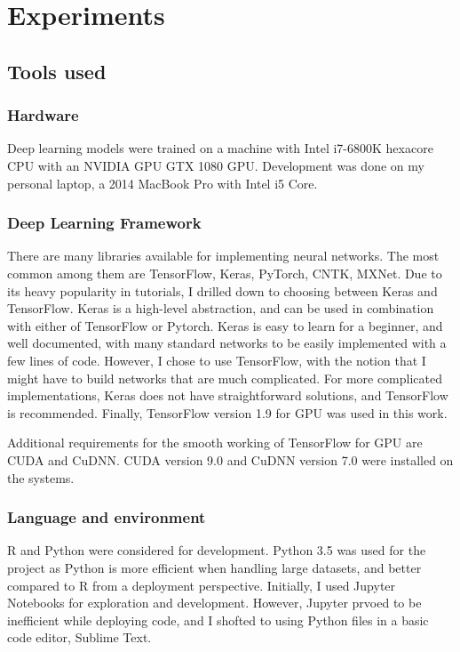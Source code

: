 \chapter{Experiments}

\section{Tools used}

\subsection{Hardware}
Deep learning models were trained on a machine with Intel i7-6800K hexacore CPU with an NVIDIA GPU GTX 1080 GPU. Development was done on my personal laptop, a 2014 MacBook Pro with Intel i5 Core.

\subsection{Deep Learning Framework}
There are many libraries available for implementing neural networks. The most common among them are TensorFlow\cite{noauthor_TensorFlow:_2018}, Keras\cite{noauthor_keras_nodate}, PyTorch\cite{noauthor_pytorch_nodate}, CNTK\cite{noauthor_microsoft_2018}, MXNet\cite{noauthor_incubator-mxnet:_2018}. Due to its heavy popularity in tutorials, I drilled down to choosing between Keras and TensorFlow. Keras is a high-level abstraction, and can be used in combination with either of TensorFlow or Pytorch. Keras is easy to learn for a beginner, and well documented, with many standard networks to be easily implemented with a few lines of code. However, I chose to use TensorFlow, with the notion that I might have to build networks that are much complicated. For more complicated implementations, Keras does not have straightforward solutions, and TensorFlow is recommended. 
Finally, TensorFlow version 1.9 for GPU was used in this work.

Additional requirements for the smooth working of TensorFlow for GPU are CUDA and CuDNN. CUDA version 9.0 and CuDNN version 7.0 were installed on the systems.

\subsection{Language and environment}
R and Python were considered for development. Python 3.5 was used for the project as Python is more efficient when handling large datasets, and better compared to R from a deployment perspective.
Initially, I used Jupyter Notebooks for exploration and development. However, Jupyter prvoed to be inefficient while deploying code, and I shofted to using Python files in a basic code editor, Sublime Text\cite{noauthor_sublime_nodate}. 

